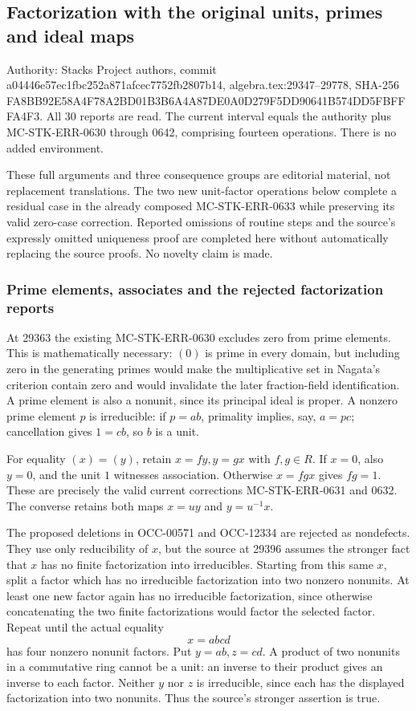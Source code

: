\subsection{Factorization with the original units, primes and ideal maps}\label{factorization-with-the-original-units-primes-and-ideal-maps}

Authority: Stacks Project authors, commit a04446e57ec1fbc252a871afcec7752fb2807b14, algebra.tex:29347--29778, SHA-256 FA8BB92E58A4F78A2BD01B3B6A4A87DE0A0D279F5DD90641B574DD5FBFFFA4F3. All 30 reports are read. The current interval equals the authority plus MC-STK-ERR-0630 through 0642, comprising fourteen operations. There is no added environment.

These full arguments and three consequence groups are editorial material, not replacement translations. The two new unit-factor operations below complete a residual case in the already composed MC-STK-ERR-0633 while preserving its valid zero-case correction. Reported omissions of routine steps and the source's expressly omitted uniqueness proof are completed here without automatically replacing the source proofs. No novelty claim is made.

\subsubsection{Prime elements, associates and the rejected factorization reports}\label{prime-elements-associates-and-the-rejected-factorization-reports}

At 29363 the existing MC-STK-ERR-0630 excludes zero from prime elements. This is mathematically necessary: \((0)\) is prime in every domain, but including zero in the generating primes would make the multiplicative set in Nagata's criterion contain zero and would invalidate the later fraction-field identification. A prime element is also a nonunit, since its principal ideal is proper. A nonzero prime element \(p\) is irreducible: if \(p=ab\), primality implies, say, \(a=pc\); cancellation gives \(1=cb\), so \(b\) is a unit.

For equality \((x)=(y)\), retain \(x=fy,y=gx\) with \(f,g\in R\). If \(x=0\), also \(y=0\), and the unit \(1\) witnesses association. Otherwise \(x=fgx\) gives \(fg=1\). These are precisely the valid current corrections MC-STK-ERR-0631 and 0632. The converse retains both maps \(x=uy\) and \(y=u^{-1}x\).

The proposed deletions in OCC-00571 and OCC-12334 are rejected as nondefects. They use only reducibility of \(x\), but the source at 29396 assumes the stronger fact that \(x\) has no finite factorization into irreducibles. Starting from this same \(x\), split a factor which has no irreducible factorization into two nonzero nonunits. At least one new factor again has no irreducible factorization, since otherwise concatenating the two finite factorizations would factor the selected factor. Repeat until the actual equality \[
 x=a b c d
\] has four nonzero nonunit factors. Put \(y=ab,z=cd\). A product of two nonunits in a commutative ring cannot be a unit: an inverse to their product gives an inverse to each factor. Neither \(y\) nor \(z\) is irreducible, since each has the displayed factorization into two nonunits. Thus the source's stronger assertion is true.

